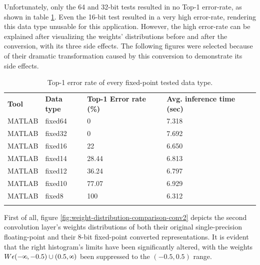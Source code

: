 Unfortunately, only the 64 and 32-bit tests resulted in no Top-1 error-rate, as shown in table \ref{tab:fixed-error-rates}. Even the 16-bit test resulted in a very high error-rate, rendering this data type unusable for this application. However, the high error-rate can be explained after visualizing the weights' distributions before and after the conversion, with its three side effects. The following figures were selected because of their dramatic transformation caused by this conversion to demonstrate its side effects.

\begin{table}[H]
	\caption{Top-1 error rate of every fixed-point tested data type.}
	\label{tab:fixed-error-rates}
	\centering
	\begin{tabular}{p{2cm} p{2cm} p{3cm} p{3cm}}
		\toprule
		\textbf{Tool} & \textbf{Data type} & \textbf{Top-1 Error rate (\%)} & \textbf{Avg. inference time (sec)} \\
			MATLAB 	& fixed64	& 0 		& 7.318 \\
			MATLAB 	& fixed32	& 0 		& 7.692 \\
			MATLAB 	& fixed16	& 22 		& 6.650 \\
			MATLAB 	& fixed14	& 28.44 	& 6.813 \\
			MATLAB 	& fixed12	& 36.24 	& 6.797 \\
			MATLAB 	& fixed10	& 77.07		& 6.929 \\
			MATLAB 	& fixed8	& 100 		& 6.312 \\
		\bottomrule\\
	\end{tabular}
\end{table}

First of all, figure \ref{fig:weight-distribution-comparison-conv2} depicts the second convolution layer's weights distributions of both their original single-precision floating-point and their 8-bit fixed-point converted representations. It is evident that the right histogram's limits have been significantly altered, with the weights $W \epsilon (-\infinity, -0.5) \cup (0.5, \infinity)$ been suppressed to the $(-0.5, 0.5)$ range.

